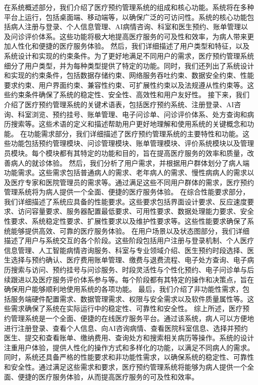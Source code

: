 在系统概述部分，我们介绍了医疗预约管理系统的组成和核心功能。系统将在多种平台上运行，包括桌面端、移动端等，以确保广泛的可访问性。系统的核心功能包括病人注册与登录、个人信息管理、AI病情咨询、科室和医生预约、账单管理以及问诊评价体系。这些功能将极大地提高医疗服务的可及性和效率，为病人带来更加人性化和便捷的医疗服务体验。
然后，我们详细描述了用户类型和特征，以及系统设计和实现的约束条件。为了更好地满足不同用户的需求，医疗预约管理系统细分了用户类型，并为每种类型提供了特定的功能。同时，我们还列出了系统设计和实现的约束条件，包括数据存储约束、网络服务吞吐约束、数据安全约束、性能要求约束、用户界面约束、兼容性约束、可扩展性约束以及法规遵从性约束等。这些约束条件确保了系统的稳定性、安全性、高效性和用户友好性。
接下来，我们介绍了医疗预约管理系统的关键术语表，包括医疗预约系统、注册登录、AI咨询、科室浏览、预约挂号、账单管理、电子问诊单、问诊评价体系、处方查询和病历搜索等。这些术语的定义和描述帮助用户更好地理解和使用系统的关键概念和功能。
在功能需求部分，我们详细描述了医疗预约管理系统的主要特性和功能。这些功能包括预约管理模块、问诊管理模块、账单管理模块、评价系统模块以及管理员模块。每个模块都有其特定的功能和目的，旨在提高医疗服务的效率和质量，改善病人的就诊体验。
然后，我们分析了用户需求，并根据用户群体划分了病人端功能需求。这些需求包括普通病人的需求、老年病人的需求、慢性病病人的需求以及医疗专家和医院管理员的需求等。通过满足这些不同用户群体的需求，医疗预约管理系统将为病人提供一个全面、便捷的医疗服务体验。
在综合性能要求部分，我们详细描述了系统应具备的性能要求。这些要求包括界面设计要求、反应速度要求、访问容量要求、服务器配置最低要求、可用性要求、数据处理能力要求、安全性要求、系统稳定性要求、扩展性要求以及维护性要求等。这些性能要求确保了系统能够提供高效、可靠的医疗服务体验。
在用户场景以及状态图部分，我们详细描述了用户与系统交互的各个阶段。这些阶段包括用户注册与登录机制、个人医疗信息管理、人工智能病情咨询服务、科室与专业领域介绍、医生预约时段选择、医生选择与预约确认、医疗费用账单管理、缴费与退费流程、电子处方查询、电子病历搜索与访问、预约挂号与问诊服务、时段灵活性与个性化预约、电子问诊单与后续跟进以及医疗服务评价体系参与等。每个阶段都有其特定的操作和决策点，旨在确保用户能够顺利地使用系统的各项功能。
最后，我们介绍了非功能性需求，包括服务端硬件配置需求、数据管理需求、权限与安全需求以及软件质量属性等。这些需求确保了系统在实际运行中的稳定性、可靠性和安全性。
综上所述，医疗预约管理系统是一个全面、便捷的在线医疗服务平台。通过该系统，病人可以方便地进行注册登录、查看个人信息、向AI咨询病情、查看医院科室信息、选择并预约医生、提交和查看账单、缴纳费用、查询处方和搜索相关病历等操作。系统的设计注重用户体验，提供人性化的操作方式和多样化的功能，以满足不同病人的需求。同时，系统还具备严格的性能要求和非功能性需求，以确保系统的稳定性、可靠性和安全性。通过满足这些需求和要求，医疗预约管理系统将能够为病人提供一个全面、便捷的医疗服务体验，从而提高医疗服务的可及性和效率。